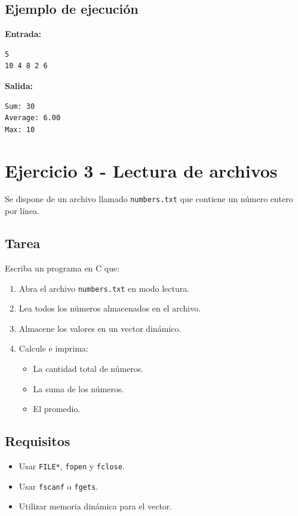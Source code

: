 \documentclass[12pt,a4paper]{article}
\begin{document}
\subsection*{Ejemplo de ejecución}
\textbf{Entrada:}
\begin{lstlisting}[numbers=none]
5
10 4 8 2 6
\end{lstlisting}

\textbf{Salida:}
\begin{lstlisting}[numbers=none]
Sum: 30
Average: 6.00
Max: 10
\end{lstlisting}
\newpage

\section*{Ejercicio 3 - Lectura de archivos}

Se dispone de un archivo llamado \texttt{numbers.txt} que contiene un número entero por línea.

\subsection*{Tarea}
Escriba un programa en C que:
\begin{enumerate}
    \item Abra el archivo \texttt{numbers.txt} en modo lectura.
    \item Lea todos los números almacenados en el archivo.
    \item Almacene los valores en un vector dinámico.
    \item Calcule e imprima:
    \begin{itemize}
        \item La cantidad total de números.
        \item La suma de los números.
        \item El promedio.
    \end{itemize}
\end{enumerate}

\subsection*{Requisitos}
\begin{itemize}
    \item Usar \texttt{FILE*}, \texttt{fopen} y \texttt{fclose}.
    \item Usar \texttt{fscanf} o \texttt{fgets}.
    \item Utilizar memoria dinámica para el vector.
\end{itemize}
\end{document}

